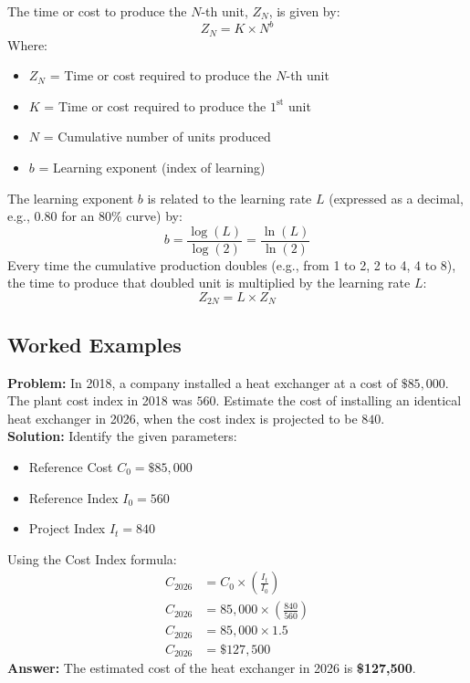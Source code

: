 \documentclass[12pt,a4paper]{article}
\begin{document}
\begin{tcolorbox}[formulabox, title={\textbf{Crawford's Learning Curve Model}}]
The time or cost to produce the $N$-th unit, $Z_N$, is given by:
\begin{equation}
  Z_N = K \times N^b
\end{equation}
Where:
\begin{itemize}[leftmargin=1.5em, itemsep=1pt, topsep=2pt]
  \item[] $Z_N$ = Time or cost required to produce the $N$-th unit
  \item[] $K$ = Time or cost required to produce the $1^{\text{st}}$ unit
  \item[] $N$ = Cumulative number of units produced
  \item[] $b$ = Learning exponent (index of learning)
\end{itemize}
\par\vspace{4pt}
The learning exponent $b$ is related to the learning rate $L$ (expressed as a decimal, e.g., $0.80$ for an $80\%$ curve) by:
\begin{equation}
  b = \frac{\log(L)}{\log(2)} = \frac{\ln(L)}{\ln(2)}
\end{equation}
Every time the cumulative production doubles (e.g., from 1 to 2, 2 to 4, 4 to 8), the time to produce that doubled unit is multiplied by the learning rate $L$:
\begin{equation}
  Z_{2N} = L \times Z_N
\end{equation}
\end{tcolorbox}

\subsection{Worked Examples}

\begin{tcolorbox}[examplebox, title={Example 1: Cost Index Model}]
\textbf{Problem:} In 2018, a company installed a heat exchanger at a cost of $\$85,000$. The plant cost index in 2018 was $560$. Estimate the cost of installing an identical heat exchanger in 2026, when the cost index is projected to be $840$.\\[4pt]
\textbf{Solution:}
Identify the given parameters:
\begin{itemize}[leftmargin=*, itemsep=1pt]
  \item[] Reference Cost $C_0 = \$85,000$
  \item[] Reference Index $I_0 = 560$
  \item[] Project Index $I_t = 840$
\end{itemize}
Using the Cost Index formula:
\begin{align*}
  C_{2026} &= C_0 \times \left( \frac{I_t}{I_0} \right) \\[4pt]
  C_{2026} &= 85,000 \times \left( \frac{840}{560} \right) \\[4pt]
  C_{2026} &= 85,000 \times 1.5 \\[4pt]
  C_{2026} &= \$127,500
\end{align*}
\textbf{Answer:} The estimated cost of the heat exchanger in 2026 is \textbf{\$127,500}.
\end{tcolorbox}
\end{document}
